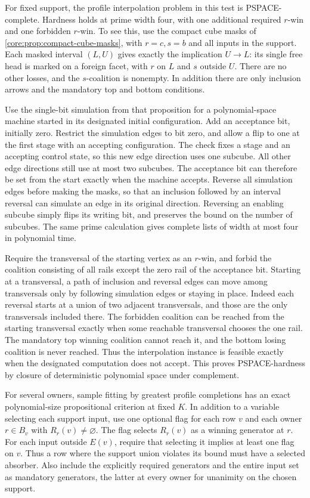 For fixed support, the profile interpolation problem
in this test is PSPACE-complete. Hardness holds at
prime width four, with one additional required
$r$-win and one forbidden $r$-win. To see this, use
the compact cube masks of \cref{core:prop:compact-cube-masks},
with $r=c,s=b$ and all inputs in the support.
Each masked interval $(L,U)$ gives exactly the
implication $U\to L$: its single free head is marked
on a foreign facet, with $r$ on $L$ and $s$ outside
$U$. There are no other losses, and the $s$-coalition
is nonempty. In addition there are only inclusion
arrows and the mandatory top and bottom conditions.

Use the single-bit simulation from that proposition
for a polynomial-space machine started in its
designated initial configuration. Add an acceptance
bit, initially zero. Restrict the simulation edges to
bit zero, and allow a flip to one at the first stage
with an accepting configuration. The check fixes a
stage and an accepting control state, so this new
edge direction uses one subcube. All other edge
directions still use at most two subcubes. The
acceptance bit can therefore be set from the start
exactly when the machine accepts. Reverse all
simulation edges before making the masks, so that
an inclusion followed by an interval reversal can
simulate an edge in its original direction. Reversing
an enabling subcube simply flips its writing bit,
and preserves the bound on the number of subcubes.
The same prime calculation gives complete lists of
width at most four in polynomial time.

Require the transversal of the starting vertex as an
$r$-win, and forbid the coalition consisting of all
rails except the zero rail of the acceptance bit.
Starting at a transversal, a path of inclusion and
reversal edges can move among transversals only by
following simulation edges or staying in place.
Indeed each reversal starts at a union of two
adjacent transversals, and those are the only
transversals included there. The forbidden coalition
can be reached from the starting transversal exactly
when some reachable transversal chooses the one
rail. The mandatory top winning coalition cannot
reach it, and the bottom losing coalition is never
reached. Thus the interpolation instance is feasible
exactly when the designated computation does not
accept. This proves PSPACE-hardness by closure of
deterministic polynomial space under complement.

For several owners, sample fitting by greatest profile
completions has an exact polynomial-size propositional
criterion at fixed $K$. In addition to a variable selecting
each support input, use one optional flag for each row $v$
and each owner $r\in B_v$ with $R_r(v)\ne\varnothing$.
The flag selects $R_r(v)$ as a winning generator at $r$.
For each input outside $E(v)$, require that selecting it
implies at least one flag on $v$. Thus a row where the
support union violates its bound must have a selected
absorber. Also include the explicitly required generators
and the entire input set as mandatory generators, the
latter at every owner for unanimity on the chosen support.

